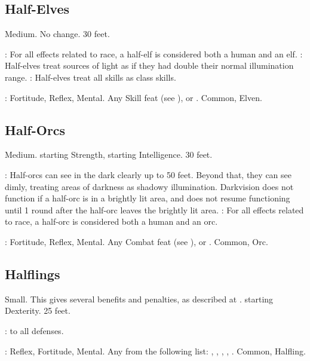 \subsection{Half-Elves}
 Medium.
 No change.
 30 feet.
\begin{itemize}
    : For all effects related to race, a half-elf is considered both a human and an elf.
    : Half-elves treat sources of light as if they had double their normal illumination range.
    : Half-elves treat all skills as class skills.
\end{itemize}
:  Fortitude, Reflex, Mental.
 Any Skill feat (see ), or .
 Common, Elven.

\subsection{Half-Orcs}
 Medium.
  starting Strength,  starting Intelligence.
 30 feet.
\begin{itemize}
    : Half-orcs can see in the dark clearly up to 50 feet.   Beyond that, they can see dimly, treating areas of darkness as shadowy illumination. Darkvision does not function if a half-orc is in a brightly lit area, and does not resume functioning until 1 round after the half-orc leaves the brightly lit area.
    : For all effects related to race, a half-orc is considered both a human and an orc.
\end{itemize}
:  Fortitude,  Reflex,  Mental.
 Any Combat feat (see ), or .
 Common, Orc.

\subsection{Halflings}
 Small. This gives several benefits and penalties, as described at .
  starting Dexterity.
 25 feet.
\begin{itemize}
    :  to all defenses.
\end{itemize}
:  Reflex,  Fortitude,  Mental.
 Any from the following list: , , , , .
 Common, Halfling.
